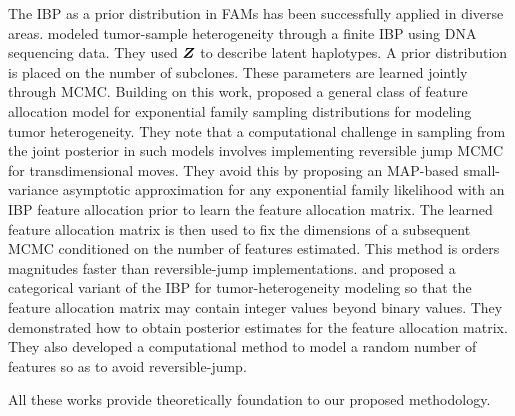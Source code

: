 \documentclass[12pt,]{article}
\newcommand{\bZ}{\mbox{\boldmath $Z$}}
\begin{document}


The IBP as a prior distribution in FAMs has been successfully applied in
diverse areas. \cite{lee2015bayesian} modeled tumor-sample heterogeneity
through a finite IBP using DNA sequencing data.  They used $\bZ$ to describe
latent haplotypes. A prior distribution is placed on the number of subclones.
These parameters are learned jointly through MCMC.  Building on this work,
\cite{xu2015mad} proposed a general class of feature allocation model for
exponential family sampling distributions for modeling tumor heterogeneity.
They note that a computational challenge in sampling from the joint posterior
in such models involves implementing reversible jump MCMC
\citep{green1995reversible} for transdimensional moves. They avoid this by
proposing an MAP-based small-variance asymptotic approximation for any
exponential family likelihood with an IBP feature allocation prior to learn the
feature allocation matrix. The learned feature allocation matrix is then used
to fix the dimensions of a subsequent MCMC conditioned on the number of
features estimated. This method is orders magnitudes faster than
reversible-jump implementations.  \cite{sengupta2014bayclone} and
\cite{lee2016bayesian} proposed a categorical variant of the IBP for
tumor-heterogeneity modeling so that the feature allocation matrix may contain
integer values beyond binary values.  They demonstrated how to obtain posterior
estimates for the feature allocation matrix. They also developed a
computational method to model a random number of features so as to avoid
reversible-jump.

All these works provide theoretically foundation to our proposed methodology.
\end{document}
